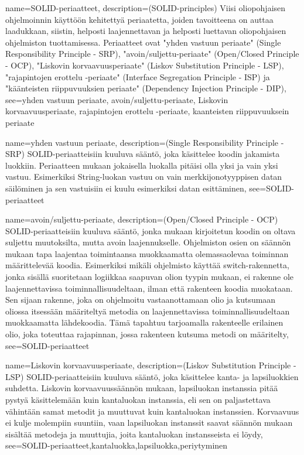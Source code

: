 {
	name=SOLID-periaatteet,
	description={(SOLID-principles) Viisi oliopohjaisen ohjelmoinnin käyttöön kehitettyä
periaatetta, joiden tavoitteena on auttaa laadukkaan, siistin, helposti laajennettavan ja helposti
luettavan oliopohjaisen ohjelmiston tuottamisessa. Periaatteet ovat "yhden vastuun periaate"
(Single Responsibility Principle - SRP), "avoin/suljettu-periaate" (Open/Closed Principle - OCP),
"Liskovin korvaavuusperiaate" (Liskov Substitution Principle - LSP), "rajapintojen erottelu
-periaate" (Interface Segregation Principle - ISP) ja "käänteisten riippuvuuksien periaate"
(Dependency Injection Principle - DIP)},
	see={yhden vastuun periaate,  avoin/suljettu-periaate, Liskovin korvaavuusperiaate, 
	rajapintojen erottelu -periaate, kaanteisten riippuvuuksein periaate}
}

{
	name=yhden vastuun periaate,
	description={(Single Responsibility Principle - SRP) SOLID-periaatteisiin kuuluva sääntö, joka
käsittelee koodin jakamista luokkiin. Periaatteen mukaan jokaisella luokalla pitäisi olla yksi ja
vain yksi vastuu. Esimerkiksi String-luokan vastuu on vain merkkijonotyyppisen datan säilöminen ja
sen vastuisiin ei kuulu esimerkiksi datan esittäminen},
	see={SOLID-periaatteet}
}

{
	name=avoin/suljettu-periaate,
	description={(Open/Closed Principle - OCP) SOLID-periaatteisiin kuuluva sääntö, jonka mukaan
kirjoitetun koodin on oltava suljettu muutoksilta, mutta avoin laajennukselle. Ohjelmiston osien
on säännön mukaan tapa laajentaa toimintaansa muokkaamatta olemassaolevaa toiminnan määrittelevää
koodia. Esimerkiksi mikäli ohjelmisto käyttää switch-rakennetta, jonka sisällä suoritetaan
logiikkaa saapuvan olion tyypin mukaan, ei rakenne ole laajennettavissa toiminnallisuudeltaan,
ilman että rakenteen koodia muokataan. Sen sijaan rakenne, joka on ohjelmoitu vastaanottamaan
olio ja kutsumaan oliossa itsessään määriteltyä metodia on laajennettavissa toiminnallisuudeltaan
muokkaamatta lähdekoodia. Tämä tapahtuu tarjoamalla rakenteelle erilainen olio, joka toteuttaa
rajapinnan, jossa rakenteen kutsuma metodi on määritelty},
	see={SOLID-periaatteet}
}

{
	name=Liskovin korvaavuusperiaate,
	description={(Liskov Substitution Principle - LSP) SOLID-periaatteisiin kuuluva sääntö, joka
käsittelee kanta- ja lapsiluokkien suhdetta. Liskovin korvaavuussäännön mukaan, lapsiluokan
instanssia pitää pystyä käsittelemään kuin kantaluokan instanssia, eli sen on paljastettava
vähintään samat metodit ja muuttuvat kuin kantaluokan instanssien. Korvaavuus ei kulje molempiin
suuntiin, vaan lapsiluokan instanssit saavat säännön mukaan sisältää metodeja ja muuttujia, joita
kantaluokan instansseista ei löydy},
	see={SOLID-periaatteet,kantaluokka,lapsiluokka,periytyminen}
}

